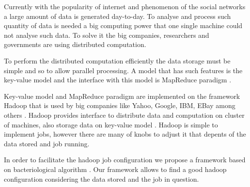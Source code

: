 Currently with the popularity of internet and phenomenon of the social
networks a large amount of data is generated day-to-day. To analyse and
process such quantity of data is needed a big computing power that one
single machine could not analyse such data. To solve it the big companies,
researchers and governments are using distributed computation.

To perform the distributed computation efficiently the data storage must
be simple and so to allow parallel processing. A model that has such features
is the key-value model and the interface with this model is MapReduce
paradigm \cite{Dean:2004}.

Key-value model and MapReduce paradigm are implemented on the framework
Hadoop that is used by big companies like Yahoo, Google, IBM, EBay
among others \cite{hadoop_use}. Hadoop provides interface to distribute data and
computation on cluster of machines, also storage data on key-value
model \cite{hadoop}. Hadoop is simple to implement jobs, however there are many of
knobs to adjust it that depents of the data stored and job running.

In order to facilitate the hadoop job configuration we propose a framework based on
bacteriological algorithm \cite{baudry}. Our framework allows to find a good
hadoop configuration considering the data stored and the job in question.
